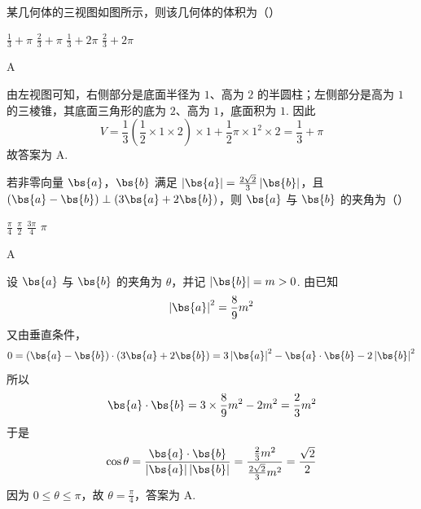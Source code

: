 \begin{problem}
某几何体的三视图如图所示，则该几何体的体积为（\quad）


\choices
    {\(\frac{1}{3} + \pi\)}
    {\(\frac{2}{3} + \pi\)}
    {\(\frac{1}{3} + 2\pi\)}
    {\(\frac{2}{3} + 2\pi\)}

\begin{answer}
A
\end{answer}

\begin{solution}
由左视图可知，右侧部分是底面半径为 \(1\)、高为 \(2\) 的半圆柱；左侧部分是高为 \(1\) 的三棱锥，其底面三角形的底为 \(2\)、高为 \(1\)，底面积为 \(1\). 因此
\[
V=\frac13\left(\frac12\times1\times2\right)\times1+\frac12\pi\times1^2\times2=\frac13+\pi
\]
故答案为 A.
\end{solution}
\end{problem}

\begin{problem}
若非零向量 \(\bs{a}\)，\(\bs{b}\) 满足 \( \left|\bs{a}\right|=\frac{2\sqrt{2}}{3}\left|\bs{b}\right| \)，且 \( (\bs{a}-\bs{b})\perp(3\bs{a}+2\bs{b}) \)，则 \(\bs{a}\) 与 \(\bs{b}\) 的夹角为（\quad）

\choices
    {\( \frac{\pi}{4} \)}
    {\( \frac{\pi}{2} \)}
    {\( \frac{3\pi}{4} \)}
    {\(\pi\)}

\begin{answer}
A
\end{answer}

\begin{solution}
设 \(\bs{a}\) 与 \(\bs{b}\) 的夹角为 \(\theta\)，并记 \(\left|\bs{b}\right|=m>0\). 由已知
\[
\left|\bs{a}\right|^2=\frac89m^2
\]
又由垂直条件，
\[
0=(\bs{a}-\bs{b})\cdot(3\bs{a}+2\bs{b})=3\left|\bs{a}\right|^2-\bs{a}\cdot\bs{b}-2\left|\bs{b}\right|^2
\]
所以
\[
\bs{a}\cdot\bs{b}=3\times\frac89m^2-2m^2=\frac23m^2
\]
于是
\[
\cos\theta=\frac{\bs{a}\cdot\bs{b}}{\left|\bs{a}\right|\left|\bs{b}\right|}=\frac{\frac23m^2}{\frac{2\sqrt2}{3}m^2}=\frac{\sqrt2}{2}
\]
因为 \(0\leqslant\theta\leqslant\pi\)，故 \(\theta=\frac\pi4\)，答案为 A.
\end{solution}
\end{problem}

